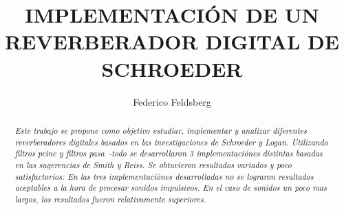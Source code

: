 \documentclass[]{article}
\title{\textbf{\LARGE{\textsf{IMPLEMENTACIÓN DE UN REVERBERADOR DIGITAL DE SCHROEDER}}}}
\date{} %
\begin{document}


\renewcommand{\headrulewidth}{0pt} %


\author[1]{Federico Feldsberg} %


\begin{minipage}[h]{\textwidth} %
    \maketitle
    \thispagestyle{fancy}
    \fancyhf{}
    \rhead{\today}
    \cfoot{\thepage}

\end{minipage}


\begin{abstract}

\textit{Este trabajo se propone como objetivo estudiar, implementar y analizar
diferentes reverberadores digitales basados en las investigaciones de Schroeder y Logan.
Utilizando filtros peine y filtros pasa~-todo se desarrollaron 3 implementaciónes
distintas basadas en las sugerencias de Smith y Reiss. Se obtuvieron resultados variados y poco satisfactorios:
En las tres implementaciónes desarrolladas no se lograron resultados aceptables a la
hora de procesar sonidos impulsivos. En el caso de sonidos un poco mas largos, los resultados
fueron relativamente superiores.
 }
\end{abstract}

\vspace{0.8 cm}%
\end{document}
